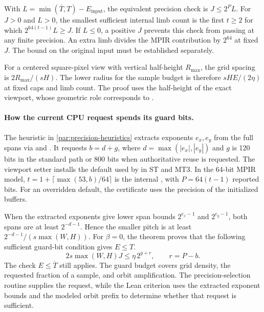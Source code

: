 With \(L=\min(\overline T,T)-E_{\mathrm{input}}\), the equivalent
precision check is \(J\le 2^P L\). For \(J>0\) and \(L>0\), the smallest
sufficient internal limb count is the first \(t\ge2\) for which
\(2^{64(t-1)}L\ge J\). If \(L\le0\), a positive \(J\) prevents this check
from passing at any finite precision. An extra limb divides the MPIR
contribution by \(2^{64}\) at fixed \(J\). The bound on the original input
must be established separately.

For a centered square-pixel view with vertical half-height \(R_{\max}\),
the grid spacing is \(2R_{\max}/(sH)\). The lower radius for the sample
budget is therefore \(sH E/(2\eta)\) at fixed caps and limb count.
The proof uses the half-height of the exact viewport, whose geometric role
corresponds to .

\paragraph{How the current CPU request spends its guard bits.}
The heuristic in \cref{par:precision-heuristics} extracts exponents
\(e_x,e_y\) from the full spans via  and
. It requests \(b=d+g\), where
\(d=\max(|e_x|,|e_y|)\) and \(g\) is 120 bits in the standard path or
800 bits when authoritative reuse is requested. The viewport setter
installs the default used by  in ST and MT3. In the
64-bit MPIR model, \(t=1+\lceil\max(53,b)/64\rceil\) is the internal
, with \(P=64(t-1)\) reported bits. For an overridden
default, the certificate uses the precision of the initialized buffers.

When the extracted exponents give lower span bounds \(2^{e_x-1}\) and
\(2^{e_y-1}\), both spans are at least \(2^{-d-1}\). Hence the smaller
pitch is at least \(2^{-d-1}/(s\max(W,H))\).
For \(\beta=0\), the theorem 
proves that the following sufficient guard-bit condition gives \(E\le T\).
\begin{equation}
  2s\max(W,H)J \le \eta\,2^{g+r},\qquad r=P-b .
  \label{eq:reference-orbit-proof-cpu-guard}
\end{equation}
The check \(E\le\overline T\) still applies. The guard budget covers grid
density, the requested fraction of a sample, and orbit amplification.
The precision-selection routine supplies the request, while the Lean
criterion uses the extracted exponent bounds and the modeled orbit
prefix to determine whether that request is sufficient.

